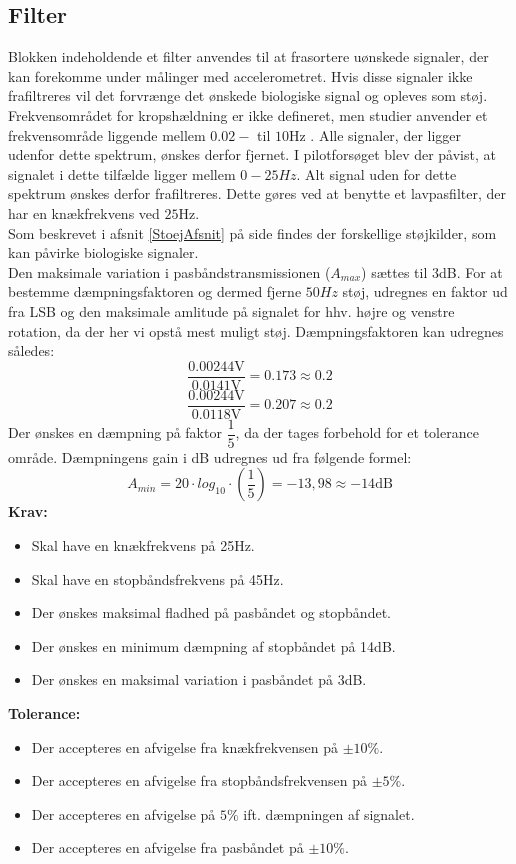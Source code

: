 \subsection{Filter}\label{FilterAfs}
Blokken indeholdende et filter anvendes til at frasortere uønskede signaler, der kan forekomme under målinger med accelerometret. Hvis disse signaler ikke frafiltreres vil det forvrænge det ønskede biologiske signal og opleves som støj. Frekvensområdet for kropshældning er ikke defineret, men studier anvender et frekvensområde liggende mellem $0.02-$ til $10$Hz \cite{Martinez-Mendez2011}. Alle signaler, der ligger udenfor dette spektrum, ønskes derfor fjernet. I pilotforsøget blev der påvist, at signalet i dette tilfælde ligger mellem $0-25Hz$. Alt signal uden for dette spektrum ønskes derfor frafiltreres. Dette gøres ved at benytte et lavpasfilter, der har en knækfrekvens ved $25$Hz. \\
Som beskrevet i afsnit \ref{StoejAfsnit} på side \pageref{StoejAfsnit} findes der forskellige støjkilder, som kan påvirke biologiske signaler. \\
Den maksimale variation i pasbåndstransmissionen ($A_{max}$) sættes til 3dB. For at bestemme dæmpningsfaktoren og dermed fjerne $50Hz$ støj, udregnes en faktor ud fra LSB og den maksimale amlitude på signalet for hhv. højre og venstre rotation, da der her vi opstå mest muligt støj. Dæmpningsfaktoren kan udregnes således:
\begin{equation}
\dfrac{0.00244\text{V}}{0.0141\text{V}} = 0.173 \approx 0.2 
\end{equation}
\begin{equation}
\dfrac{0.00244\text{V}}{0.0118\text{V}} = 0.207  \approx 0.2
\end{equation}
Der ønskes en dæmpning på faktor $\dfrac{1}{5}$, da der tages forbehold for et tolerance område. Dæmpningens gain i dB udregnes ud fra følgende formel:   
\begin{equation}
A_{min}=20 \cdot log_{10} \cdot (\frac{1}{5}) = -13,98 \approx -14\text{dB}
\end{equation}
\textbf{Krav:}
\begin{itemize}
	\item Skal have en knækfrekvens på 25Hz.
	\item Skal have en stopbåndsfrekvens på 45Hz.
	\item Der ønskes maksimal fladhed på pasbåndet og stopbåndet.
	\item Der ønskes en minimum dæmpning af stopbåndet på 14dB.
	\item Der ønskes en maksimal variation i pasbåndet på 3dB.
\end{itemize}
\textbf{Tolerance:}
\begin{itemize}
	\item Der accepteres en afvigelse fra knækfrekvensen på $\pm10\%$.
	\item Der accepteres en afvigelse fra stopbåndsfrekvensen på $\pm5\%$.
	\item Der accepteres en afvigelse på $5\%$ ift. dæmpningen af signalet.
	\item Der accepteres en afvigelse fra pasbåndet på $\pm10\%$.
\end{itemize}
